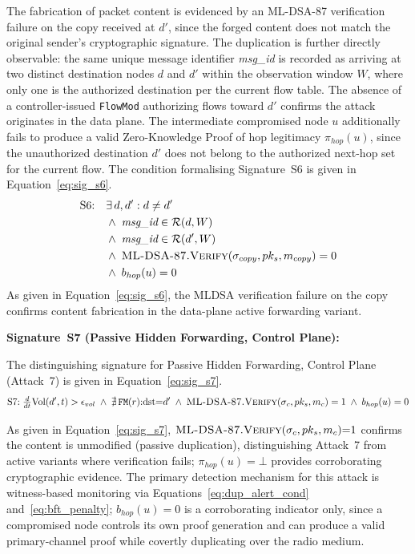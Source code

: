 \documentclass[12pt, a4paper]{report}
\begin{document}
The fabrication of packet content is evidenced by an ML-DSA-87 verification
failure on the copy received at $d'$, since the forged content does not
match the original sender's cryptographic signature.
The duplication is further directly observable: the same unique message
identifier \textit{msg\_id} is recorded as arriving at two distinct
destination nodes $d$ and $d'$ within the observation window $W$, where
only one is the authorized destination per the current flow table.
The absence of a controller-issued \texttt{FlowMod} authorizing flows
toward $d'$ confirms the attack originates in the data plane.
The intermediate compromised node $u$ additionally fails to produce a valid
Zero-Knowledge Proof of hop legitimacy $\pi_{hop}(u)$, since the
unauthorized destination $d'$ does not belong to the authorized next-hop
set for the current flow.
The condition formalising Signature~S6 is given in
Equation~\eqref{eq:sig_s6}.
\begin{equation}
\begin{aligned}
\text{S6:}\quad
  & \exists\, d, d' : d \neq d' \\
  & \wedge\; \textit{msg\_id} \in \mathcal{R}(d, W) \\
  & \wedge\; \textit{msg\_id} \in \mathcal{R}(d', W) \\
  & \wedge\; \textsc{ML-DSA-87.Verify}(
    \sigma_{copy}, pk_s, m_{copy}) = 0 \\
  & \wedge\; b_{hop}(u) = 0
\end{aligned}
\label{eq:sig_s6}
\end{equation}
As given in Equation~\eqref{eq:sig_s6}, the
\ac{MLDSA} verification failure on the copy
confirms content fabrication in the data-plane
active forwarding variant.



\textbf{Signature~S7 (Passive Hidden Forwarding, Control Plane):}

The distinguishing signature for Passive Hidden
Forwarding, Control Plane (Attack~7) is given in
Equation~\eqref{eq:sig_s7}.
\begin{equation}
\text{S7:}\;
\tfrac{d}{dt}\text{Vol}(d',t) > \epsilon_{vol}
\;\land\; \nexists\,\texttt{FM}(r){:}\text{dst}{=}d'
\;\land\; \textsc{ML-DSA-87.Verify}(
\sigma_c, pk_s, m_c) = 1
\;\land\; b_{hop}(u) = 0
\label{eq:sig_s7}
\end{equation}

As given in Equation~\eqref{eq:sig_s7},
$\textsc{ML-DSA-87.Verify}(\sigma_c, pk_s, m_c){=}1$
confirms the content is unmodified (passive duplication),
distinguishing Attack~7 from active variants where
verification fails; $\pi_{hop}(u){=}\bot$ provides
corroborating cryptographic evidence. The primary
detection mechanism for this attack is witness-based
monitoring via Equations~\eqref{eq:dup_alert_cond}
and~\eqref{eq:bft_penalty}; $b_{hop}(u){=}0$ is a
corroborating indicator only, since a compromised node
controls its own proof generation and can produce a
valid primary-channel proof while covertly duplicating
over the radio medium.
\end{document}
